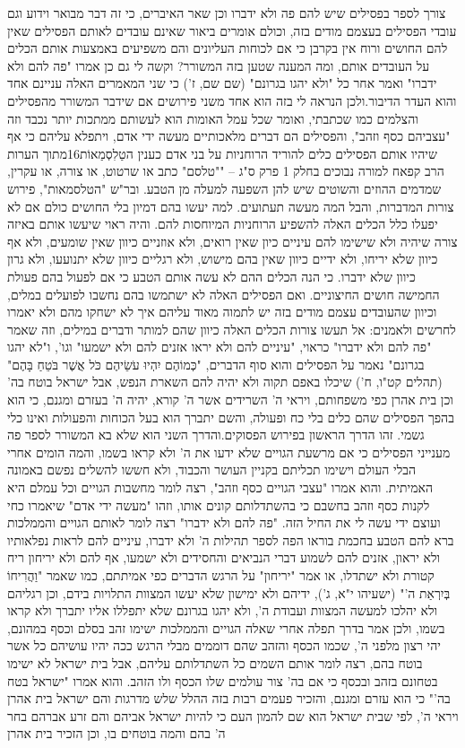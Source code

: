 \documentclass[12pt, openany]{book}
\begin{document}
צורך לספר בפסילים שיש להם פה ולא ידברו וכן שאר האיברים, כי זה דבר מבואר וידוע וגם עובדי הפסילים בעצמם מודים בזה, וכולם אומרים ביאור שאינם עובדים לאותם הפסילים שאין להם החושים ורוח אין בקרבן כי אם לכוחות העליונים והם משפיעים באמצעות אותם הכלים על העובדים אותם, ומה המענה שטען בזה המשורר? וקשה לי גם כן אמרו "פה להם ולא ידברו" ואמר אחר כל "ולא יהגו בגרונם" (שם שם, ז') כי שני המאמרים האלה עניינם אחד והוא העדר הדיבור.ולכן הנראה לי בזה הוא אחד משני פירושים אם שידבר המשורר מהפסילים והצלמים כמו שכתבתי, ואומר שכל עמל האומות הוא לעשותם ממתכות יותר נכבד וזה "עצביהם כסף וזהב", והפסילים הם דברים מלאכותיים מעשה ידי אדם, ויתפלא עליהם כי אף שיהיו אותם הפסילים כלים להוריד הרוחניות על בני אדם כענין הטַלִסְמַאוֹת16מתוך הערות הרב קפאח למורה נבוכים בחלק 1 פרק ס"ג – ""טלסם" כתב או שרטוט, או צורה, או עקרין, שמדמים ההוזים והשוטים שיש להן השפעה למעלה מן הטבע. ובר"ש "הטלסמאות", פירוש צורות המדברות, והבל המה מעשה תעתועים. למה יעשו בהם דמיון בלי החושים כולם אם לא יפעלו כלל הכלים האלה להשפיע הרוחניות המיוחסות להם. והיה ראוי שיעשו אותם באיזה צורה שיהיה ולא שישימו להם עיניים כיון שאין רואים, ולא אוזניים כיוון שאין שומעים, ולא אף כיוון שלא יריחו, ולא ידיים כיוון שאין בהם מישוש, ולא רגליים כיוון שלא יתנועעו, ולא גרון כיוון שלא ידברו. כי הנה הכלים ההם לא עשה אותם הטבע כי אם לפעול בהם פעולת החמישה חושים החיצוניים. ואם הפסילים האלה לא ישתמשו בהם נחשבו לפועלים במלים, וכיוון שהעובדים עצמם מודים בזה יש לתמוה מאוד עליהם איך לא ישחקו מהם ולא יאמרו לחרשים ולאמנים: אל תעשו צורות הכלים האלה כיוון שהם למותר ודברים במילים, וזה שאמר "פה להם ולא ידברו" כראוי, "עיניים להם ולא יראו אזנים להם ולא ישמעו" וגו', ו"לא יהגו בגרונם" נאמר על הפסילים והוא סוף הדברים, "כְּמוֹהֶם יִהְיוּ עֹשֵׂיהֶם כֹּל אֲשֶׁר בֹּטֵחַ בָּהֶם" (תהלים קט"ו, ח') שיכלו באפם תקוה ולא יהיה להם השארת הנפש, אבל ישראל בוטח בה' וכן בית אהרן כפי משפחותם, ויראי ה' השרידים אשר ה' קורא, יהיה ה' בעזרם ומגנם, כי הוא בהפך הפסילים שהם כלים בלי כח ופעולה, והשם יתברך הוא בעל הכוחות והפעולות ואינו כלי גשמי. זהו הדרך הראשון בפירוש הפסוקים.והדרך השני הוא שלא בא המשורר לספר פה מענייני הפסילים כי אם מרשעת הגויים שלא ידעו את ה' ולא קראו בשמו, והמה הומים אחרי הבלי העולם וישימו תכליתם בקניין העושר והכבוד, ולא חששו להשלים נפשם באמונה האמיתית. והוא אמרו "עצבי הגויים כסף וזהב", רצה לומר מחשבות הגויים וכל עמלם היא לקנות כסף וזהב בחשבם כי בהשתדלותם קונים אותו, וזהו "מעשה ידי אדם" שיאמרו כחי ועוצם ידי עשה לי את החיל הזה. "פה להם ולא ידברו" רצה לומר לאותם הגויים והממלכות ברא להם הטבע בחכמת בוראו הפה לספר תהילות ה' ולא ידברו, עיניים להם לראות נפלאותיו ולא יראון, אזנים להם לשמוע דברי הנביאים והחסידים ולא ישמעו, אף להם ולא יריחון ריח קטורת ולא ישתדלו, או אמר "יריחון" על הרגש הדברים כפי אמיתתם, כמו שאמר "וַהֲרִיחוֹ בְּיִרְאַת ה'" (ישעיהו י"א, ג'), ידיהם ולא ימישון שלא יעשו המצוות התלויות בידם, וכן רגליהם ולא יהלכו למעשה המצוות ועבודת ה', ולא יהגו בגרונם שלא יתפללו אליו יתברך ולא קראו בשמו, ולכן אמר בדרך תפלה אחרי שאלה הגויים והממלכות ישימו זהב בסלם וכסף במהונם, יהי רצון מלפני ה', שכמו הכסף והזהב שהם דוממים מבלי הרגש ככה יהיו עושיהם  כל אשר בוטח בהם, רצה לומר אותם השמים כל השתדלותם עליהם, אבל בית ישראל לא ישימו בטחונם בזהב ובכסף כי אם בה' צור עולמים שלו הכסף ולו הזהב. והוא אמרו "ישראל בטח בה'" כי הוא עזרם ומגנם,  והזכיר פעמים רבות בזה ההלל שלש מדרגות והם ישראל בית אהרן ויראי ה', לפי שבית ישראל הוא שם להמון העם כי להיות ישראל אביהם והם זרע אברהם בחר ה' בהם והמה בוטחים בו, וכן הזכיר בית אהרן 
\end{document}
